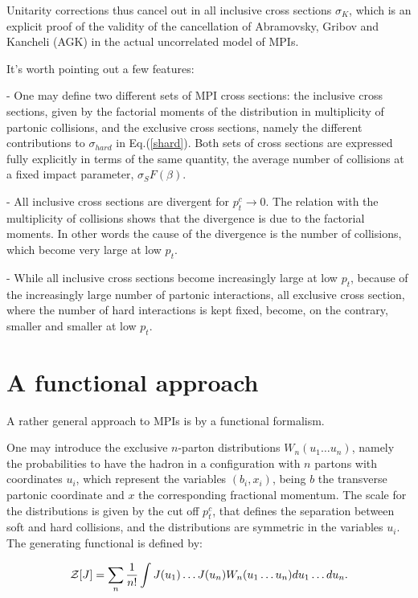 \documentclass{ws-rv9x6}
\begin{document}
Unitarity corrections thus cancel out in all inclusive cross sections $\sigma_K$, which is an explicit proof of the validity of the cancellation of Abramovsky, Gribov and Kancheli (AGK)\cite{Abramovsky:1973fm} in the actual uncorrelated model of MPIs.

It's worth pointing out a few features:

\noindent - One may define two different sets of MPI cross sections: the inclusive cross sections, given by the factorial moments of the distribution in multiplicity of partonic collisions, and the exclusive cross sections, namely the different contributions to
$\sigma_{hard}$ in Eq.(\ref{shard}). Both sets of cross sections are expressed fully explicitly in terms of the same quantity, the average number of collisions at a fixed impact parameter, $\sigma_SF(\beta)$. 

\noindent - All inclusive cross sections are divergent for $p_t^c\to0$. The relation with the multiplicity of collisions
shows that the divergence is due to the factorial moments. In other words the cause of the divergence is the number of collisions, which become very
large at low $p_t$.

\noindent - While all inclusive cross sections become increasingly
large at low $p_t$, because of the increasingly large number of partonic
interactions, all exclusive cross section, where the number of
hard interactions is kept fixed, become, on the contrary,
smaller and smaller at low $p_t$.

\section{A functional approach}

\par A rather general approach to MPIs is by a functional
formalism\cite{Calucci:1991qq}.

One may introduce the exclusive $n$-parton
distributions $W_n(u_1\dots u_n)$, namely the probabilities to have the hadron in a
configuration with $n$ partons with coordinates $u_i$, which
represent the variables $(b_i,x_i)$, being $b$ the transverse
partonic coordinate and $x$ the corresponding fractional momentum.
The scale for the distributions is given by the cut off
$p_t^c$, that defines the separation between soft and hard
collisions, and the distributions are symmetric in the variables
$u_i$. The generating
functional is defined by:

\begin{equation}{\cal Z}[J]=\sum_n{1\over n!}\int J(u_1)\dots J(u_n)W_n(u_1\dots u_n)
du_1\dots du_n.\end{equation}
\end{document}
